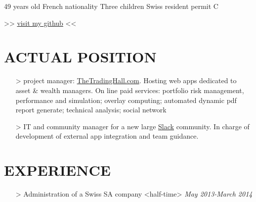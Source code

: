\documentclass{res}
\begin{document}
\color{mygreen}
\pagecolor{myblack}


\address{Rue de la Dôle, 12 - 1203 Geneva  +41~(79)~392~79~56  \href{mailto:arnaud.gaboury@gmail.com}{arnaud.gaboury@gmail.com}        }
\begin{resume}%
                        
\begin{center}  
\vspace{-0.8 cm}
49 years  old  French nationality  Three children  Swiss resident permit C 


\setlength{\fboxsep}{10pt}%

\textmd{>> \href{https://github.com/gabx}{visit my github} <<}
\end{center} 

\section{ACTUAL POSITION}
\begin{enumerate}[leftmargin=0cm]
\item[>] project manager: \href{http://thetradinghall.com}{TheTradingHall.com}. Hosting web apps dedicated to asset \& wealth managers. On line paid services: portfolio risk management, performance and simulation; overlay computing; automated dynamic pdf report generate; technical analysis; social network
\item[>] IT and community manager for a new large \href{http://slack.com}{Slack} community. In charge of development of external app integration and team guidance.
\end{enumerate}
\section{EXPERIENCE}
\begin{enumerate}[leftmargin=0cm]
\item[>]Administration of a Swiss SA company <half-time>
\hfill \textit{May 2013-March 2014}


\end{enumerate}
\end{resume}
\end{document}

